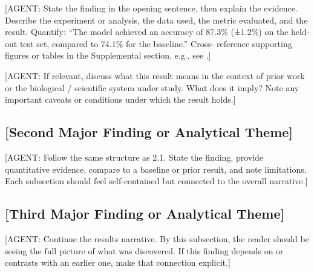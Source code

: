 \documentclass[9pt,a4paper,twocolumn,twoside]{rho-class/rho}
\begin{document}
        [AGENT: State the finding in the opening sentence,
        then explain the evidence. Describe the experiment
        or analysis, the data used, the metric evaluated,
        and the result. Quantify: ``The model achieved an
        accuracy of 87.3\% (±1.2\%) on the held-out test
        set, compared to 74.1\% for the baseline.'' Cross-
        reference supporting figures or tables in the
        Supplemental section, e.g., see .]

        [AGENT: If relevant, discuss what this result means
        in the context of prior work or the biological /
        scientific system under study. What does it imply?
        Note any important caveats or conditions under
        which the result holds.]

    \subsection{[Second Major Finding or Analytical Theme]}

        [AGENT: Follow the same structure as 2.1. State the
        finding, provide quantitative evidence, compare to a
        baseline or prior result, and note limitations. Each
        subsection should feel self-contained but connected
        to the overall narrative.]

    \subsection{[Third Major Finding or Analytical Theme]}

        [AGENT: Continue the results narrative. By this
        subsection, the reader should be seeing the full
        picture of what was discovered. If this finding
        depends on or contrasts with an earlier one, make
        that connection explicit.]

\end{document}
